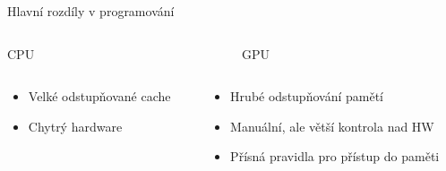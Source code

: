 \documentclass[compress,mathserif]{beamer}
\theoremstyle{definition}
\theoremstyle{plain}
\newcommand{\beI}{\begin{itemize}}
\newcommand{\enI}{\end{itemize}}
\begin{document}
    \begin{frame}{Hlavní rozdíly v programování}

    \begin{minipage}{\textwidth}
        \begin{columns}
        \begin{column}{0.4\textwidth}
            \begin{center}
                CPU
            \end{center}
        \end{column}
        \begin{column}{0.6\textwidth}
            \begin{center}
                GPU
            \end{center}
        \end{column}
        \end{columns}
    \end{minipage}

    \begin{minipage}{\textwidth}
        \begin{columns}
        \begin{column}{0.4\textwidth}
            \begin{center}
                \beI
                    \item Velké odstupňované cache
                    \item Chytrý hardware
                \enI
            \end{center}
        \end{column}
        \begin{column}{0.6\textwidth}
            \begin{center}
                \beI
                    \item Hrubé odstupňování pamětí
                    \item Manuální, ale větší kontrola nad HW
                    \item Přísná pravidla pro přístup do paměti
                \enI
            \end{center}
        \end{column}
        \end{columns}
    \end{minipage}


\end{frame}
\end{document}
